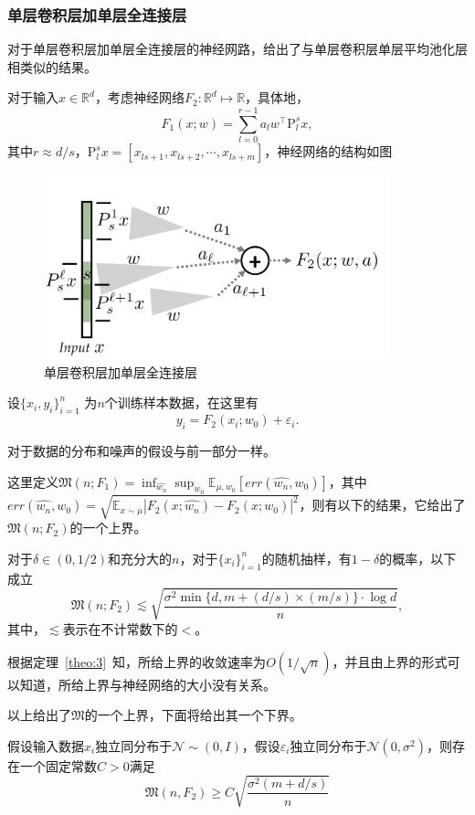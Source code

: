 \subsubsection{单层卷积层加单层全连接层}
对于单层卷积层加单层全连接层的神经网路，\citet{du2018many}给出了与单层卷积层单层平均池化层相类似的结果。
\par
对于输入$x\in \mathbb{R}^d$，考虑神经网络$F_2: \mathbb{R}^d \mapsto \mathbb{R}$，具体地，
\[
  F_1(x;w) = \sum_{l=0}^{r-1}a_l w^{\top} \mathrm{P}_l^s x,
\]
其中$r\approx d/s$，$\mathrm{P}_l^s x=[x_{ls+1},x_{ls+2},\cdots,x_{ls+m}]$，神经网络的结构如图
\begin{figure}
\centering
\includegraphics[width=10cm]{./figures/convf.PNG}
\caption{单层卷积层加单层全连接层}
\label{fig:convf}
\end{figure}
\par
设$\{x_i,y_i\}_{i=1}^n$ 为$n$个训练样本数据，在这里有
\[
  y_i = F_2(x_i;w_0)+\varepsilon_i.
\]
\par
对于数据的分布和噪声的假设与前一部分一样。
\par
这里定义$\mathfrak{M}(n;F_1) = \inf_{\hat{w_n}}\sup_{w_0}\mathbb{E}_{\mu,w_0}[err(\hat{w_n},w_0)]$，其中$err(\hat{w_n},w_0) = \sqrt{\mathbb{E}_{x\sim\mu}|F_2(x;\hat{w_n})- F_2(x;w_0)|^2}$，则有以下的结果，它给出了$\mathfrak{M}(n;F_2)$的一个上界。
\begin{theorem}\label{theo:3}
对于$\delta\in (0,1/2)$和充分大的$n$，对于$\{x_i\}_{i=1}^n$的随机抽样，有$1-\delta$的概率，以下成立
\[
	\mathfrak{M}(n;F_2) \lesssim \sqrt{\frac{\sigma^2 \min\{d,m+(d/s)\times (m/s)\}\cdot \log d}{n}},
\]
其中，$\lesssim$表示在不计常数下的$<$。
\end{theorem}


\par
根据定理~\ref{theo:3}~知，所给上界的收敛速率为$O(1/\sqrt{n})$，并且由上界的形式可以知道，所给上界与神经网络的大小没有关系。
\par
以上给出了$\mathfrak{M}$的一个上界，下面将给出其一个下界。
\begin{theorem}\label{theo:4}
假设输入数据$x_i$独立同分布于$\mathcal{N}\sim (0,I)$，假设$\varepsilon_i$独立同分布于$\mathcal{N}(0,\sigma^2)$，则存在一个固定常数$C > 0$满足
\begin{equation}
\mathfrak{M}(n,F_2) \geq C\sqrt{\frac{\sigma^2 (m+d/s)}{n}}
\end{equation}
\end{theorem}



